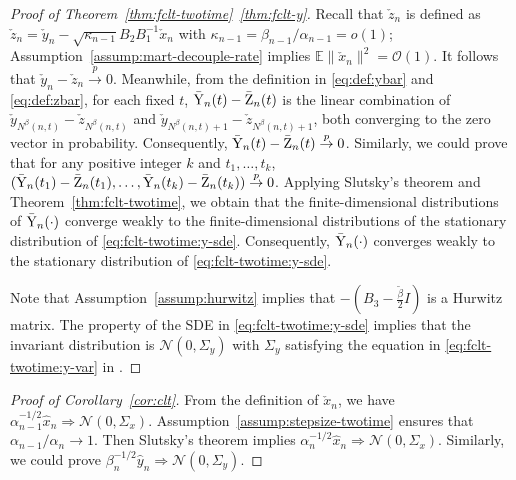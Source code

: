 \documentclass[11pt]{article}
\theoremstyle{plain}
\theoremstyle{definition}
\def\invdiffslow{\tilde{\beta}}
\def\mI{{\bm{I}}}
\def\NM{{\mathcal N}}
\def\OM{{\mathcal O}}
\def\EB{{\mathbb E}}
\newcommand{\xhat}{{\hat{x}}}
\newcommand{\yhat}{{\hat{y}}}
\newcommand{\xcheck}{{\check{x}}}
\newcommand{\ycheck}{{\check{y}}}
\newcommand{\zcheck}{{\check{z}}}
\newcommand{\ybar}{{\bar{\textnormal{Y}}}}
\newcommand{\zbar}{{\bar{\textnormal{Z}}}}
\def\mI{{I}}
\def\weakconverge{\Rightarrow}
\begin{document}
\begin{appendix}
\begin{proof}[Proof of Theorem~\ref{thm:fclt-twotime}~\ref{thm:fclt-y}]
    Recall that $\zcheck_{n}$ is defined as $\zcheck_{n} = \ycheck_{n} - \sqrt{ \kappa_{n-1} } B_2 B_1^{-1} \xcheck_{n}$ with $\kappa_{n-1} = \beta_{n-1} / \alpha_{n-1} = o(1)$; Assumption~\ref{assump:mart-decouple-rate} implies $\EB \| \xcheck_{n} \|^2 = \OM(1)$.
    It follows that $\ycheck_{n} - \zcheck_{n} \overset{p}{\to} 0$.
    Meanwhile, from the definition in \eqref{eq:def:ybar} and \eqref{eq:def:zbar}, for each fixed $t$, $\ybar_{n}(t) - \zbar_{n}(t)$ is the linear combination of $\ycheck_{N^\beta(n,t)} -  \zcheck_{N^\beta(n,t)}$ and $\ycheck_{N^\beta(n,t)+1} -  \zcheck_{N^\beta(n,t)+1}$, both converging to the zero vector in probability.
    Consequently, $\ybar_{n}(t) - \zbar_{n}(t) \overset{p}{\to} 0$. 
    Similarly, we could prove that for any positive integer $k$ and $t_1, \ldots, t_k$,
    $(\ybar_{n}(t_1) - \zbar_{n}(t_1), \dots, \ybar_{n}(t_k) - \zbar_{n} (t_k) ) \overset{p}{\to} 0$.
    Applying Slutsky's theorem and Theorem~\ref{thm:fclt-twotime}, we obtain that the finite-dimensional distributions of $\ybar_{n}(\cdot)$ converge weakly to the finite-dimensional distributions of the stationary distribution of \eqref{eq:fclt-twotime:y-sde}.
    Consequently, $\ybar_{n}(\cdot)$ converges weakly to the stationary distribution of \eqref{eq:fclt-twotime:y-sde}.
    
    Note that Assumption~\ref{assump:hurwitz} implies that $-\left(B_3 - \frac{\invdiffslow}{2} \mI \right)$ is a Hurwitz matrix.
    The property of the SDE in \eqref{eq:fclt-twotime:y-sde} implies that the invariant distribution is $\NM(0, \Sigma_{y})$ with $\Sigma_y$ satisfying the equation in \eqref{eq:fclt-twotime:y-var} in \cite[Section~6.5]{risken1996fokker}.
\end{proof}


\begin{proof}[Proof of Corollary~\ref{cor:clt}]
    From the definition of $\xcheck_{n}$, we have $\alpha_{n-1}^{-1/2} \xhat_{n} \weakconverge \NM(0, \Sigma_x)$.
    Assumption~\ref{assump:stepsize-twotime} ensures that $\alpha_{n-1} / \alpha_{n} \to 1$.
    Then Slutsky's theorem implies $\alpha_{n}^{-1/2} \xhat_{n} \weakconverge \NM(0, \Sigma_x)$.
    Similarly, we could prove $\beta_{n}^{-1/2} \yhat_{n} \weakconverge \NM(0, \Sigma_y)$.
    

\end{proof}
\end{appendix}
\end{document}
